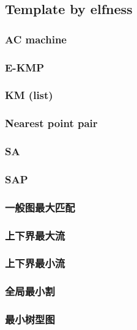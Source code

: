\subsection{Template by elfness}
\subsubsection{AC machine}

\subsubsection{E-KMP}

\subsubsection{KM (list)}

\subsubsection{Nearest point pair}

\subsubsection{SA}

\subsubsection{SAP}

\subsubsection{一般图最大匹配}

\subsubsection{上下界最大流}

\subsubsection{上下界最小流}

\subsubsection{全局最小割}

\subsubsection{最小树型图}


